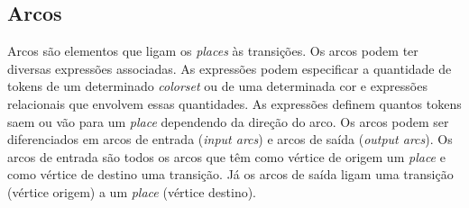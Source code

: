 \documentclass[a4paper,10pt]{article}
\begin{document}
																
		\subsection{Arcos}\label{Arcos}
		
			Arcos são elementos que ligam os \textit{places} às transições. 
			Os arcos podem ter diversas expressões associadas. As expressões podem especificar a quantidade de tokens 
			de um determinado \textit{colorset} ou de uma determinada cor e expressões relacionais que envolvem essas quantidades.
			As expressões definem quantos tokens saem ou vão para um \textit{place} dependendo da direção do arco. 
			Os arcos podem ser diferenciados em arcos de entrada (\textit{input arcs}) e arcos de saída 
			(\textit{output arcs}). Os arcos de entrada são todos os arcos que têm como vértice de origem um 
			\textit{place} e como vértice de destino uma transição. Já os arcos de saída ligam uma transição 
			(vértice origem) a um \textit{place} (vértice destino).
			
\end{document}
